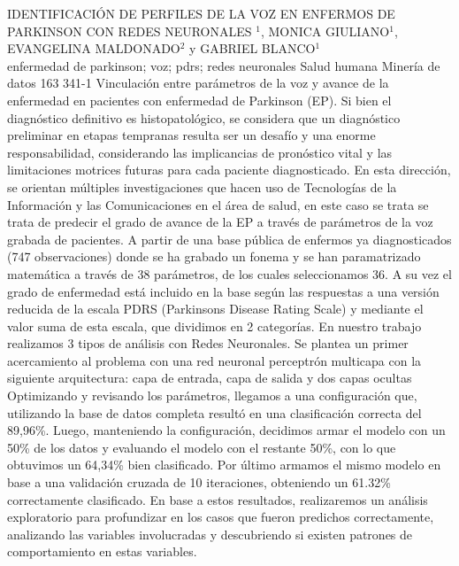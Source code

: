 \A
{IDENTIFICACIÓN DE PERFILES DE LA VOZ EN ENFERMOS DE PARKINSON CON REDES NEURONALES}
{$^1$, MONICA GIULIANO$^1$, EVANGELINA MALDONADO$^2$ y GABRIEL BLANCO$^1$}
{
\\}
{enfermedad de parkinson; voz; pdrs; redes neuronales} 
 {Salud humana} 
 {Minería de datos} 
 {163} 
 {341-1}
{Vinculación entre parámetros de la voz y avance de la enfermedad en pacientes con enfermedad de Parkinson (EP). Si bien el diagnóstico definitivo es histopatológico, se considera que un diagnóstico preliminar en etapas tempranas resulta ser un desafío y una enorme responsabilidad, considerando las implicancias de pronóstico vital y las limitaciones motrices futuras para cada paciente diagnosticado. En esta dirección, se orientan múltiples investigaciones que hacen uso de Tecnologías de la Información y las Comunicaciones en el área de salud, en este caso se trata se trata de predecir el grado de avance de la EP a través de parámetros de la voz grabada de pacientes. A partir de una base pública de enfermos ya diagnosticados (747 observaciones) donde se ha grabado un fonema y se han paramatrizado matemática a través de 38 parámetros, de los cuales seleccionamos 36. A su vez el grado de enfermedad está incluido en la base según las respuestas a una versión reducida de la escala PDRS (Parkinsons Disease Rating Scale) y mediante el valor suma de esta escala, que dividimos en 2 categorías. En nuestro trabajo realizamos 3 tipos de análisis con Redes Neuronales. Se plantea un primer acercamiento al problema con una red neuronal perceptrón multicapa con la siguiente arquitectura: capa de entrada, capa de salida y dos capas ocultas Optimizando y revisando los parámetros, llegamos a una configuración que, utilizando la base de datos completa resultó en una clasificación correcta del 89,96\%. Luego, manteniendo la configuración, decidimos armar el modelo con un 50\% de los datos y evaluando el modelo con el restante 50\%, con lo que obtuvimos un 64,34\% bien clasificado. Por último armamos el mismo modelo en base a una validación cruzada de 10 iteraciones, obteniendo un 61.32\% correctamente clasificado. En base a estos resultados, realizaremos un análisis exploratorio para profundizar en los casos que fueron predichos correctamente, analizando las variables involucradas y descubriendo si existen patrones de comportamiento en estas variables.}
